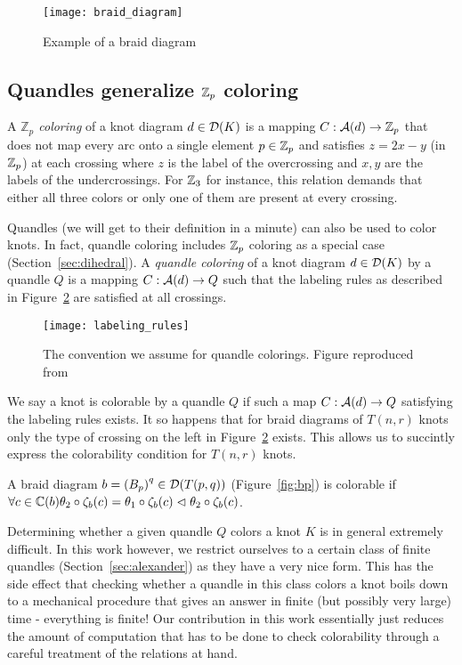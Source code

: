 \documentclass[paper.tex]{subfiles}
\begin{document}
\begin{figure}[h]
  \centering
  \texttt{[image: braid\_diagram]}
  \caption{Example of a braid diagram}\label{fig:braid_diagram}
\end{figure}

\subsection{Quandles generalize $\mathbb{Z}_p$ coloring}

A \emph{$\mathbb{Z}_p$ coloring} of a knot diagram $d \in \operatorname{\mathcal{D}}(K)$ is a mapping $C: \mathcal{A}(d) \to \mathbb{Z}_p$ that does not map every arc onto a single element $p \in \mathbb{Z}_p$ and satisfies $z = 2x - y$ (in $\mathbb{Z}_p$) at each crossing where
$z$ is the label of the overcrossing and $x,y$ are the labels of the undercrossings. For $\mathbb{Z}_3$ for instance, this relation demands that either all three colors or only one of them are present at every crossing.

Quandles (we will get to their definition in a minute) can also be used to color knots. In fact, quandle coloring includes $\mathbb{Z}_p$ coloring as a special case (Section~\ref{sec:dihedral}). A \emph{quandle coloring} of a knot diagram
$d \in \operatorname{\mathcal{D}}(K)$ by a quandle $Q$ is a mapping $C: \mathcal{A}(d) \to Q$ such that the labeling rules as described in Figure~\ref{fig:labeling_rules} are satisfied at all crossings.

\begin{figure}[H]
  \centering
  \texttt{[image: labeling\_rules]}
  \caption{The convention we assume for quandle colorings. Figure reproduced from~\cite{Cusick}}\label{fig:labeling_rules}
\end{figure}


We say a knot is colorable by a quandle $Q$ if such a map $C: \mathcal{A}(d) \to Q$ satisfying the labeling rules exists. It so happens that for braid diagrams of $T(n,r)$ knots only the type of crossing on the left in
Figure~\ref{fig:labeling_rules} exists. This allows us to succintly express the colorability condition for $T(n,r)$ knots.

A braid diagram $b = {(B_p)}^q \in \operatorname{\mathcal{D}}(T(p,q))$ (Figure~\ref{fig:bp}) is colorable if $\forall c \in  \mathbb{C}(b) \theta_2 \circ \zeta_b(c) = \theta_1 \circ \zeta_b(c) \vartriangleleft \theta_2 \circ \zeta_b(c)$.

Determining whether a given quandle $Q$ colors a knot $K$ is in general extremely difficult. In this work however, we restrict ourselves to a certain class of finite quandles (Section~\ref{sec:alexander}) as they have a very nice
form. This has the side effect that checking whether a quandle in this class colors a knot boils down to a mechanical procedure that gives an answer in finite (but possibly very large) time - everything is finite! Our contribution
in this work essentially just reduces the amount of computation that has to be done to check colorability through a careful treatment of the relations at hand.
\end{document}
